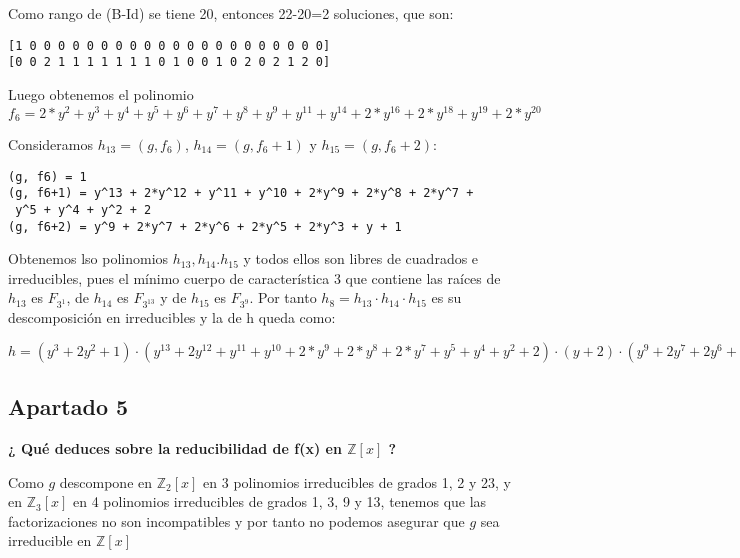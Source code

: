 \documentclass[a4paper]{article}
\begin{document}
Como rango de (B-Id) se tiene 20, entonces 22-20=2 soluciones, que son:

\begin{verbatim}
[1 0 0 0 0 0 0 0 0 0 0 0 0 0 0 0 0 0 0 0 0 0]
[0 0 2 1 1 1 1 1 1 1 0 1 0 0 1 0 2 0 2 1 2 0]
\end{verbatim}

Luego obtenemos el polinomio $f_6=2*y^2+y^3+y^4+y^5+y^6+y^7+y^8+y^9+y^11+y^14+2*y^16+2*y^18+y^19+2*y^20$

Consideramos $h_{13}=(g, f_6)$, $h_{14}=(g, f_6+1)$ y $h_{15}=(g, f_6+2)$:

\begin{verbatim}
(g, f6) = 1
(g, f6+1) = y^13 + 2*y^12 + y^11 + y^10 + 2*y^9 + 2*y^8 + 2*y^7 +
 y^5 + y^4 + y^2 + 2
(g, f6+2) = y^9 + 2*y^7 + 2*y^6 + 2*y^5 + 2*y^3 + y + 1
\end{verbatim}

Obtenemos lso polinomios $h_{13}, h_{14}. h_{15}$ y todos ellos son libres de cuadrados e irreducibles, pues el mínimo cuerpo de característica 3 que contiene las raíces de $h_{13}$ es $F_{3^{1}}$, de $h_{14}$ es $F_{3^{13}}$ y de $h_{15}$ es $F_{3^{9}}$. Por tanto $h_8=h_{13}\cdot h_{14}\cdot h_{15}$ es su descomposición en irreducibles y la de h queda como:

$h = (y^3 + 2y^2 + 1)\cdot (y^{13} + 2y^{12} + y^{11} + y^{10} + 2*y^9 + 2*y^8 + 2*y^7 + y^5 + y^4 + y^2 + 2)\cdot (y+2)\cdot (y^9 + 2y^7 + 2y^6 + 2y^5 + 2y^3 + y + 1)$


\subsection{Apartado 5}
\textbf{¿ Qué deduces sobre la reducibilidad de f(x) en $\mathbb{Z}[x]$ ?}

Como $g$ descompone en $\mathbb{Z}_2[x]$ en 3 polinomios irreducibles de grados 1, 2 y 23, y en $\mathbb{Z}_3[x]$ en 4 polinomios irreducibles de grados 1, 3, 9 y 13, tenemos que las factorizaciones no son incompatibles y por tanto no podemos asegurar que $g$ sea irreducible en $\mathbb{Z}[x]$
\end{document}
